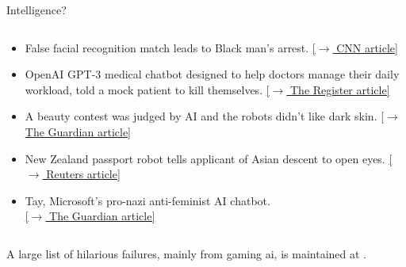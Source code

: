 \begin{frame}[t]{Intelligence?}
\begin{columns}
\begin{column}{0.73\textwidth}
\begin{itemize}
                \href{https://www.washingtonpost.com/technology/2022/06/15/tesla-autopilot-crashes/}
                {\small [$\rightarrow$ Washington Post article]}
                \item 
                False facial recognition match leads to Black man’s arrest.                
                \href{https://edition.cnn.com/2021/04/29/tech/nijeer-parks-facial-recognition-police-arrest/index.html}
                {\small [$\rightarrow$ CNN article]}
                \item 
                OpenAI GPT-3 medical chatbot designed to help doctors manage 
                their daily workload, told a mock patient to kill themselves.
                \href{https://www.theregister.com/2020/10/28/gpt3_medical_chatbot_experiment/}
                {\small [$\rightarrow$ The Register article]}
                \item 
                A beauty contest was judged by AI and the robots didn't like dark skin.
                \href{https://www.theguardian.com/technology/2016/sep/08/artificial-intelligence-beauty-contest-doesnt-like-black-people}
                {\small [$\rightarrow$ The Guardian article]}
                \item 
                New Zealand passport robot tells applicant of Asian descent to open eyes.
                \href{https://www.reuters.com/article/us-newzealand-passport-error-idUSKBN13W0RL}
                {\small [$\rightarrow$ Reuters article]}
                \item 
                Tay, Microsoft's pro-nazi anti-feminist AI chatbot.\\
                \href{https://www.theguardian.com/technology/2016/mar/24/tay-microsofts-ai-chatbot-gets-a-crash-course-in-racism-from-twitter}
                {\small [$\rightarrow$ The Guardian article]}
            \end{itemize}

        \end{column}
    \end{columns}

    \vspace{0.2cm}
    {\small
      A large list of hilarious failures, mainly from gaming \gls{ai}, 
      is maintained at \cite{GoogDoc:GamingExamplesinAI}.
    }

\end{frame}

